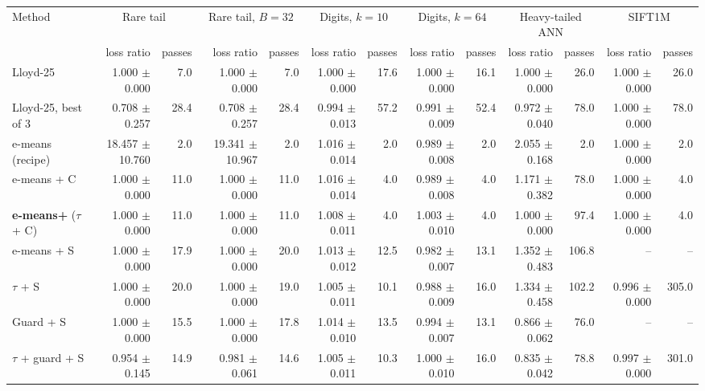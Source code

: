 \begin{tabular}{lrrrrrrrrrrrr}
\toprule
Method & \multicolumn{2}{c}{Rare tail} & \multicolumn{2}{c}{Rare tail, $B{=}32$} & \multicolumn{2}{c}{Digits, $k{=}10$} & \multicolumn{2}{c}{Digits, $k{=}64$} & \multicolumn{2}{c}{Heavy-tailed ANN} & \multicolumn{2}{c}{SIFT1M} \\
 & loss ratio & passes & loss ratio & passes & loss ratio & passes & loss ratio & passes & loss ratio & passes & loss ratio & passes \\
\midrule
Lloyd-25 & 1.000 {\scriptsize $\pm$0.000} & 7.0 & 1.000 {\scriptsize $\pm$0.000} & 7.0 & 1.000 {\scriptsize $\pm$0.000} & 17.6 & 1.000 {\scriptsize $\pm$0.000} & 16.1 & 1.000 {\scriptsize $\pm$0.000} & 26.0 & 1.000 {\scriptsize $\pm$0.000} & 26.0 \\
Lloyd-25, best of 3 & 0.708 {\scriptsize $\pm$0.257} & 28.4 & 0.708 {\scriptsize $\pm$0.257} & 28.4 & 0.994 {\scriptsize $\pm$0.013} & 57.2 & 0.991 {\scriptsize $\pm$0.009} & 52.4 & 0.972 {\scriptsize $\pm$0.040} & 78.0 & 1.000 {\scriptsize $\pm$0.000} & 78.0 \\
e-means (recipe) & 18.457 {\scriptsize $\pm$10.760} & 2.0 & 19.341 {\scriptsize $\pm$10.967} & 2.0 & 1.016 {\scriptsize $\pm$0.014} & 2.0 & 0.989 {\scriptsize $\pm$0.008} & 2.0 & 2.055 {\scriptsize $\pm$0.168} & 2.0 & 1.000 {\scriptsize $\pm$0.000} & 2.0 \\
e-means + C & 1.000 {\scriptsize $\pm$0.000} & 11.0 & 1.000 {\scriptsize $\pm$0.000} & 11.0 & 1.016 {\scriptsize $\pm$0.014} & 4.0 & 0.989 {\scriptsize $\pm$0.008} & 4.0 & 1.171 {\scriptsize $\pm$0.382} & 78.0 & 1.000 {\scriptsize $\pm$0.000} & 4.0 \\
\textbf{e-means+} ($\tau$ + C) & 1.000 {\scriptsize $\pm$0.000} & 11.0 & 1.000 {\scriptsize $\pm$0.000} & 11.0 & 1.008 {\scriptsize $\pm$0.011} & 4.0 & 1.003 {\scriptsize $\pm$0.010} & 4.0 & 1.000 {\scriptsize $\pm$0.000} & 97.4 & 1.000 {\scriptsize $\pm$0.000} & 4.0 \\
e-means + S & 1.000 {\scriptsize $\pm$0.000} & 17.9 & 1.000 {\scriptsize $\pm$0.000} & 20.0 & 1.013 {\scriptsize $\pm$0.012} & 12.5 & 0.982 {\scriptsize $\pm$0.007} & 13.1 & 1.352 {\scriptsize $\pm$0.483} & 106.8 & -- & -- \\
$\tau$ + S & 1.000 {\scriptsize $\pm$0.000} & 20.0 & 1.000 {\scriptsize $\pm$0.000} & 19.0 & 1.005 {\scriptsize $\pm$0.011} & 10.1 & 0.988 {\scriptsize $\pm$0.009} & 16.0 & 1.334 {\scriptsize $\pm$0.458} & 102.2 & 0.996 {\scriptsize $\pm$0.000} & 305.0 \\
Guard + S & 1.000 {\scriptsize $\pm$0.000} & 15.5 & 1.000 {\scriptsize $\pm$0.000} & 17.8 & 1.014 {\scriptsize $\pm$0.010} & 13.5 & 0.994 {\scriptsize $\pm$0.007} & 13.1 & 0.866 {\scriptsize $\pm$0.062} & 76.0 & -- & -- \\
$\tau$ + guard + S & 0.954 {\scriptsize $\pm$0.145} & 14.9 & 0.981 {\scriptsize $\pm$0.061} & 14.6 & 1.005 {\scriptsize $\pm$0.011} & 10.3 & 1.000 {\scriptsize $\pm$0.010} & 16.0 & 0.835 {\scriptsize $\pm$0.042} & 78.8 & 0.997 {\scriptsize $\pm$0.000} & 301.0 \\
\bottomrule
\end{tabular}
